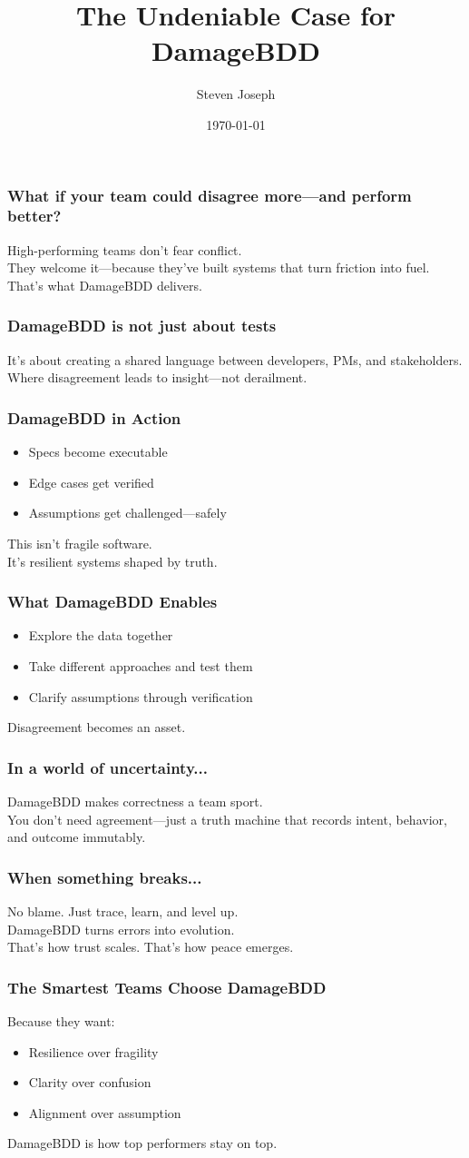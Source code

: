 \documentclass{beamer}
\title{The Undeniable Case for DamageBDD}
\author{Steven Joseph}
\date{\today}
\begin{document}
\frame{\titlepage}

\begin{frame}
\frametitle{What if your team could disagree more—and perform better?}
High-performing teams don’t fear conflict.\\
They welcome it—because they’ve built systems that turn friction into fuel.\\
That’s what DamageBDD delivers.
\end{frame}

\begin{frame}
\frametitle{DamageBDD is not just about tests}
It’s about creating a shared language between developers, PMs, and stakeholders.\\
Where disagreement leads to insight—not derailment.
\end{frame}

\begin{frame}
\frametitle{DamageBDD in Action}
\begin{itemize}
  \item Specs become executable
  \item Edge cases get verified
  \item Assumptions get challenged—safely
\end{itemize}
This isn’t fragile software.\\
It’s resilient systems shaped by truth.
\end{frame}

\begin{frame}
\frametitle{What DamageBDD Enables}
\begin{itemize}
  \item Explore the data together
  \item Take different approaches and test them
  \item Clarify assumptions through verification
\end{itemize}
Disagreement becomes an asset.
\end{frame}

\begin{frame}
\frametitle{In a world of uncertainty...}
DamageBDD makes correctness a team sport.\\
You don’t need agreement—just a truth machine that records intent, behavior, and outcome immutably.
\end{frame}

\begin{frame}
\frametitle{When something breaks...}
No blame. Just trace, learn, and level up.\\
DamageBDD turns errors into evolution.\\
That’s how trust scales. That’s how peace emerges.
\end{frame}

\begin{frame}
\frametitle{The Smartest Teams Choose DamageBDD}
Because they want:
\begin{itemize}
  \item Resilience over fragility
  \item Clarity over confusion
  \item Alignment over assumption
\end{itemize}
DamageBDD is how top performers stay on top.
\end{frame}
\end{document}

